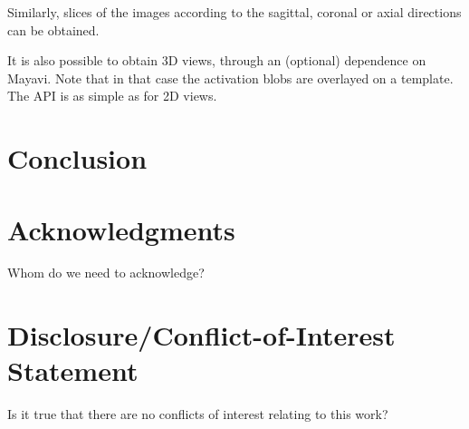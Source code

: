 \documentclass{bioinfo}
\begin{document}
Similarly, slices of the images according to the sagittal, coronal or
axial directions can be obtained.

It is also possible to obtain 3D views, through an (optional)
dependence on Mayavi. Note that in that case the activation blobs are
overlayed on a template.
%
The API is as simple as for 2D views.


\section{Conclusion}


\section*{Acknowledgments}
Whom do we need to acknowledge?

\section*{Disclosure/Conflict-of-Interest Statement}
Is it true that there are no conflicts of interest relating to this
work?
\end{document}
